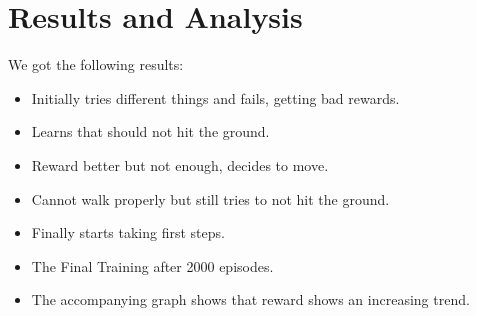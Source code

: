\documentclass[a4paper]{article}
\begin{document}
\section* {Results and Analysis}

We got the following results:
\begin{itemize}
\item Initially tries different things and fails, getting bad rewards.
\item Learns that should not hit the ground.
\item Reward better but not enough, decides to move.
\item Cannot walk properly but still tries to not hit the ground.
\item Finally starts taking first steps.
\item The Final Training after 2000 episodes.
\item The accompanying graph shows that reward shows an increasing trend.
\end{itemize}


\clearpage
\end{document}
